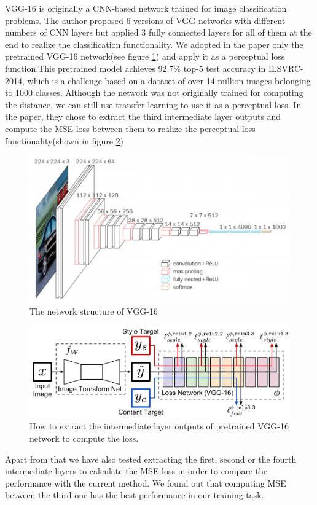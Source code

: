 \documentclass[a4paper,12pt,twoside]{report}
\begin{document}
VGG-16\cite{simonyan2014very} is originally a CNN-based network trained for image classification problems. The author proposed 6 versions of VGG networks with different numbers of CNN layers but applied 3 fully connected layers for all of them at the end to realize the classification functionality. We adopted in the paper only the pretrained VGG-16 network(see figure \ref{vgg-16}) and apply it as a perceptual loss function.This pretrained model achieves 92.7\% top-5 test accuracy in ILSVRC-2014, which is a challenge based on a dataset of over 14 million images belonging to 1000 classes. Although the network was not originally trained for computing the distance, we can still use transfer learning to use it as a perceptual loss. In the paper\cite{johnson2016perceptual}, they chose to extract the third intermediate layer outputs and compute the MSE loss between them to realize the perceptual loss functionality(shown in figure \ref{vgg-16-perceptual})
\begin{figure}
\centering
\includegraphics[width=1.0\textwidth]{vgg16.png}
\caption{The network structure of VGG-16}
\label{vgg-16}
\end{figure}
\begin{figure}
\centering
\includegraphics[width=1.0\textwidth]{SystemFigure.pdf}
\caption{How to extract the intermediate layer outputs of pretrained VGG-16 network to compute the loss.\cite{johnson2016perceptual}}
\label{vgg-16-perceptual}
\end{figure}
Apart from that we have also tested extracting the first, second or the fourth intermediate layers to calculate the MSE loss in order to compare the performance with the current method. We found out that computing MSE between the third one has the best performance in our training task.
\end{document}
